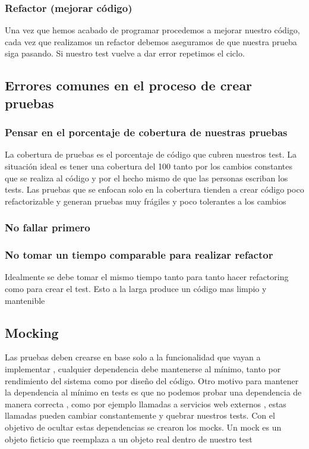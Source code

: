 \subsubsection{Refactor (mejorar código)}

Una vez que hemos acabado de programar procedemos a mejorar nuestro código,
cada vez que realizamos un refactor debemos aseguramos de que nuestra prueba
siga pasando. Si nuestro test vuelve a dar error repetimos el ciclo.

\subsection{Errores comunes en el proceso de crear pruebas}

\subsubsection{Pensar en el porcentaje de cobertura de nuestras pruebas}
La cobertura de pruebas es el porcentaje de código que cubren nuestros test. La
situación ideal es tener una cobertura del 100%
tanto por los cambios constantes que se realiza al código y por el hecho mismo
de que las personas escriban los tests. Las pruebas que se enfocan solo en la
cobertura tienden a crear código poco refactorizable y generan pruebas muy
frágiles y poco tolerantes a los cambios

\subsubsection{No fallar primero}

\subsubsection{No tomar un tiempo comparable para realizar refactor}
Idealmente se debe tomar el mismo tiempo tanto para tanto hacer refactoring
como para crear el test. Esto a la larga produce un código mas limpio y
mantenible

\subsection{Mocking}
Las pruebas deben crearse en base solo a la funcionalidad que vayan a
implementar , cualquier dependencia debe mantenerse al mínimo, tanto por
rendimiento del sistema como por diseño del código. Otro motivo para mantener
la dependencia al mínimo en tests es que no podemos probar una dependencia de
manera correcta , como por ejemplo llamadas a servicios web externos , estas
llamadas pueden cambiar constantemente y quebrar nuestros tests. Con el objetivo
de ocultar estas dependencias se crearon los mocks.  Un mock es un objeto
ficticio que reemplaza a un objeto real dentro de nuestro test


